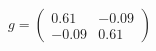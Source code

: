 \documentclass[preview]{standalone}
\begin{document}
\begin{align*}
g = \begin{pmatrix} 0.61 & -0.09 \\ -0.09 & 0.61 \end{pmatrix}
\end{align*}
\end{document}
